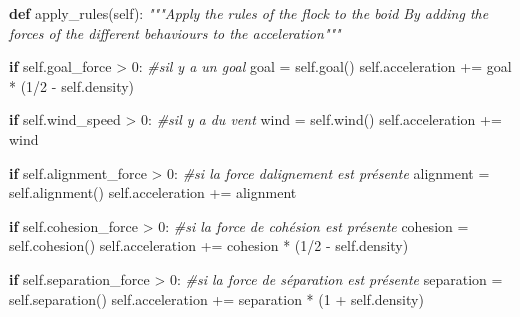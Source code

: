 \documentclass[
]{article}
\newenvironment{Shaded}{}{}
\newcommand{\CommentTok}[1]{\textcolor[rgb]{0.38,0.63,0.69}{\textit{#1}}}
\newcommand{\ControlFlowTok}[1]{\textcolor[rgb]{0.00,0.44,0.13}{\textbf{#1}}}
\newcommand{\DecValTok}[1]{\textcolor[rgb]{0.25,0.63,0.44}{#1}}
\newcommand{\KeywordTok}[1]{\textcolor[rgb]{0.00,0.44,0.13}{\textbf{#1}}}
\newcommand{\NormalTok}[1]{#1}
\newcommand{\OperatorTok}[1]{\textcolor[rgb]{0.40,0.40,0.40}{#1}}
\newcommand{\VariableTok}[1]{\textcolor[rgb]{0.10,0.09,0.49}{#1}}
\begin{document}
\begin{Shaded}
\begin{Highlighting}[]
\KeywordTok{def}\NormalTok{ apply\_rules(}\VariableTok{self}\NormalTok{):}
    \CommentTok{"""Apply the rules of the flock to the boid}
\CommentTok{    By adding the forces of the different behaviours to the acceleration"""}

    \ControlFlowTok{if} \VariableTok{self}\NormalTok{.goal\_force }\OperatorTok{\textgreater{}} \DecValTok{0}\NormalTok{: }\CommentTok{\#s\textquotesingle{}il y a un goal}
\NormalTok{        goal }\OperatorTok{=} \VariableTok{self}\NormalTok{.goal()}
        \VariableTok{self}\NormalTok{.acceleration }\OperatorTok{+=}\NormalTok{ goal }\OperatorTok{*}\NormalTok{ (}\DecValTok{1}\OperatorTok{/}\DecValTok{2} \OperatorTok{{-}} \VariableTok{self}\NormalTok{.density)}

    \ControlFlowTok{if} \VariableTok{self}\NormalTok{.wind\_speed }\OperatorTok{\textgreater{}} \DecValTok{0}\NormalTok{:  }\CommentTok{\#s\textquotesingle{}il y a du vent}
\NormalTok{        wind }\OperatorTok{=} \VariableTok{self}\NormalTok{.wind()}
        \VariableTok{self}\NormalTok{.acceleration }\OperatorTok{+=}\NormalTok{ wind}

    \ControlFlowTok{if} \VariableTok{self}\NormalTok{.alignment\_force }\OperatorTok{\textgreater{}} \DecValTok{0}\NormalTok{: }\CommentTok{\#si la force d\textquotesingle{}alignement est présente}
\NormalTok{        alignment }\OperatorTok{=} \VariableTok{self}\NormalTok{.alignment()}
        \VariableTok{self}\NormalTok{.acceleration }\OperatorTok{+=}\NormalTok{ alignment}

    \ControlFlowTok{if} \VariableTok{self}\NormalTok{.cohesion\_force }\OperatorTok{\textgreater{}} \DecValTok{0}\NormalTok{: }\CommentTok{\#si la force de cohésion est présente}
\NormalTok{        cohesion }\OperatorTok{=} \VariableTok{self}\NormalTok{.cohesion()}
        \VariableTok{self}\NormalTok{.acceleration }\OperatorTok{+=}\NormalTok{ cohesion }\OperatorTok{*}\NormalTok{ (}\DecValTok{1}\OperatorTok{/}\DecValTok{2} \OperatorTok{{-}} \VariableTok{self}\NormalTok{.density)}

    \ControlFlowTok{if} \VariableTok{self}\NormalTok{.separation\_force }\OperatorTok{\textgreater{}} \DecValTok{0}\NormalTok{: }\CommentTok{\#si la force de séparation est présente}
\NormalTok{        separation }\OperatorTok{=} \VariableTok{self}\NormalTok{.separation()}
        \VariableTok{self}\NormalTok{.acceleration }\OperatorTok{+=}\NormalTok{ separation }\OperatorTok{*}\NormalTok{ (}\DecValTok{1} \OperatorTok{+} \VariableTok{self}\NormalTok{.density)}


\end{Highlighting}
\end{Shaded}
\end{document}
